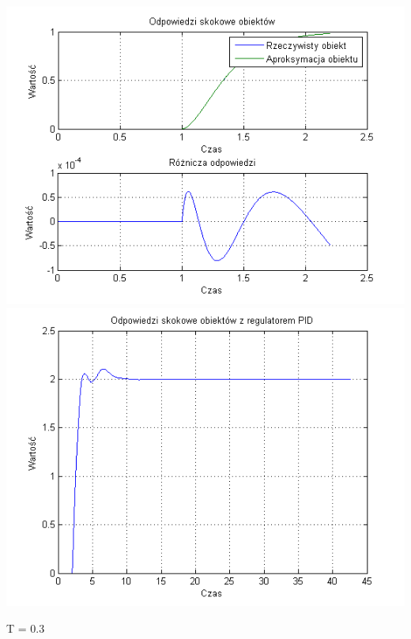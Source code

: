 \documentclass[10pt,a4paper]{article}
\begin{document}
\begin{center}
\includegraphics[scale=1]{images/dwa/skrypt_51.png}\\
\includegraphics[scale=1]{images/dwa/skrypt_52.png}\\
\end{center}
\newpage
T = 0.3
\end{document}
